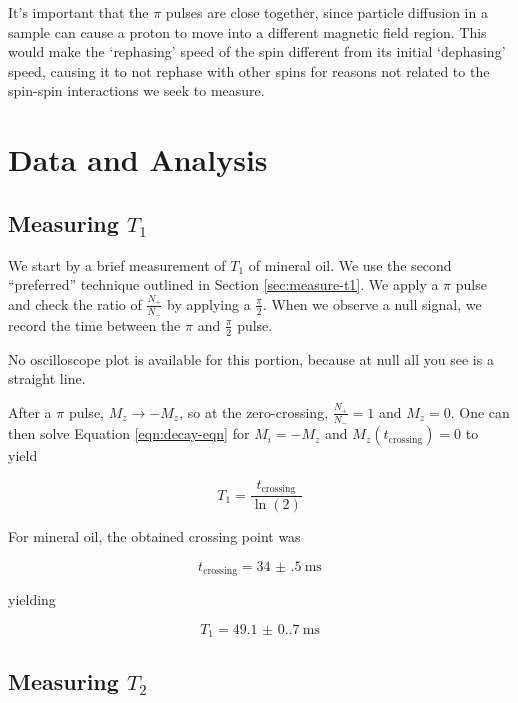 \documentclass[%
 reprint,
 amsmath,amssymb,
 aps,
]{revtex4-2}
\newcommand{\halfpi}{\frac{\pi}{2}}
\begin{document}
It's important that the $\pi$ pulses are close together, since particle diffusion in a sample can cause a proton to move into a different magnetic field region. This would make the `rephasing' speed of the spin different from its initial `dephasing' speed, causing it to not rephase with other spins for reasons not related to the spin-spin interactions we seek to measure. 

\section{Data and Analysis}

\subsection{Measuring $T_1$}

We start by a brief measurement of $T_1$ of mineral oil. We use the second ``preferred'' technique outlined in Section \ref{sec:measure-t1}. We apply a $\pi$ pulse and check the ratio of $\frac{N_+}{N_-}$ by applying a $\halfpi$. When we observe a null signal, we record the time between the $\pi$ and $\halfpi$ pulse. 

No oscilloscope plot is available for this portion, because at null all you see is a straight line. 

After a $\pi$ pulse, $M_z \rightarrow -M_z$, so at the zero-crossing, $\frac{N_+}{N_-} = 1$ and $M_z = 0$. One can then solve Equation \ref{eqn:decay-eqn} for $M_i = -M_z$ and $M_z(t_\text{crossing}) = 0$ to yield

\begin{equation}
    T_1 = \frac{t_\text{crossing}}{\ln(2)}
\end{equation}

For mineral oil, the obtained crossing point was 

\begin{equation}
    t_\text{crossing} = \SI[separate-uncertainty = true]{34(.5)}{\milli\second}
\end{equation}

yielding 

\begin{equation}
    T_1 = \SI[separate-uncertainty=true]{49.1(0.7)}{\milli\second}
\end{equation}

\subsection{Measuring $T_2$}
\end{document}
